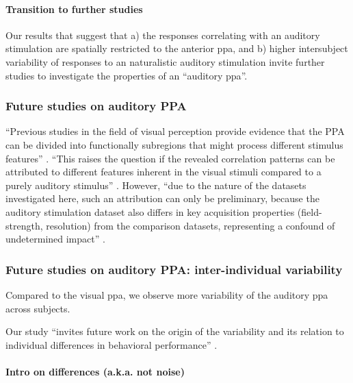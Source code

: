 \paragraph{Transition to further studies}
%
Our results that suggest that a) the responses correlating with an auditory
stimulation are spatially restricted to the anterior \ac{ppa}, and b) higher
intersubject variability of responses to an naturalistic auditory stimulation
invite further studies to investigate the properties of an ``auditory
\ac{ppa}''.


\subsubsection{Future studies on auditory PPA}


%
``Previous studies in the field of visual perception provide evidence that the
PPA can be divided into functionally subregions that might process different
stimulus features'' \citep{haeusler2022processing}.
%
``This raises the question if the revealed correlation patterns can be attributed
to different features inherent in the visual stimuli compared to a purely
auditory stimulus'' \citep{haeusler2022processing}.
%
However, ``due to the nature of the datasets investigated here, such an
attribution can only be preliminary, because the auditory stimulation dataset
also differs in key acquisition properties (field-strength, resolution) from the
comparison datasets, representing a confound of undetermined impact''
\citep{haeusler2022processing}.




\subsubsection{Future studies on auditory PPA: inter-individual variability}

%
Compared to the visual \ac{ppa}, we observe more variability of the auditory
\ac{ppa} across subjects.

%
Our study ``invites future work on the origin of the variability and its
relation to individual differences in behavioral performance''
\citep{zhen2015quantifying}.


\paragraph{Intro on differences (a.k.a. not noise)}

